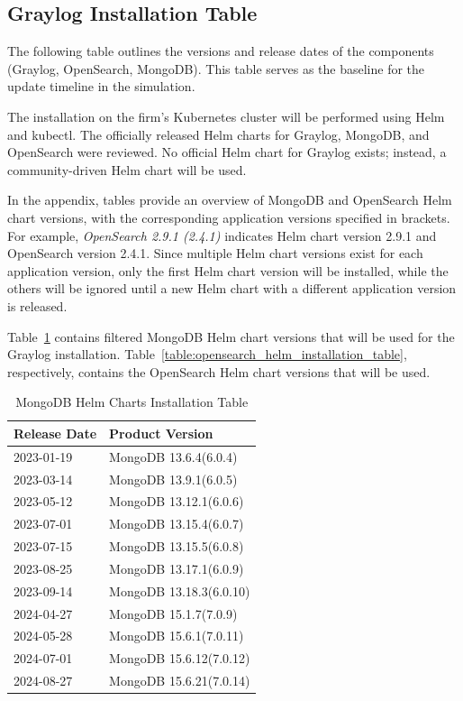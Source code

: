 \documentclass[../main.tex]{subfiles}
\begin{document}

\subsection{Graylog Installation Table}

The following table outlines the versions and release dates of the components (Graylog, OpenSearch, MongoDB). This table serves as the baseline for the update timeline in the simulation.

The installation on the firm's Kubernetes cluster will be performed using Helm and kubectl. The officially released Helm charts for Graylog, MongoDB, and OpenSearch were reviewed. No official Helm chart for Graylog exists; instead, a community-driven Helm chart will be used.  

In the appendix, tables provide an overview of MongoDB and OpenSearch Helm chart versions, with the corresponding application versions specified in brackets. For example, \textit{OpenSearch 2.9.1 (2.4.1)} indicates Helm chart version 2.9.1 and OpenSearch version 2.4.1. Since multiple Helm chart versions exist for each application version, only the first Helm chart version will be installed, while the others will be ignored until a new Helm chart with a different application version is released.

Table~\ref{table:mongodb_helm_installation_table} contains filtered MongoDB Helm chart versions that will be used for the Graylog installation. Table~\ref{table:opensearch_helm_installation_table}, respectively, contains the OpenSearch Helm chart versions that will be used.

\begin{table}[h]
\centering
\begin{tabular}{|l|l|}
\hline
\textbf{Release Date} & \textbf{Product Version} \\ \hline
2023-01-19 & MongoDB 13.6.4(6.0.4) \\ \hline
2023-03-14 & MongoDB 13.9.1(6.0.5) \\ \hline
2023-05-12 & MongoDB 13.12.1(6.0.6) \\ \hline
2023-07-01 & MongoDB 13.15.4(6.0.7) \\ \hline
2023-07-15 & MongoDB 13.15.5(6.0.8) \\ \hline
2023-08-25 & MongoDB 13.17.1(6.0.9) \\ \hline
2023-09-14 & MongoDB 13.18.3(6.0.10) \\ \hline
2024-04-27 & MongoDB 15.1.7(7.0.9) \\ \hline
2024-05-28 & MongoDB 15.6.1(7.0.11) \\ \hline
2024-07-01 & MongoDB 15.6.12(7.0.12) \\ \hline
2024-08-27 & MongoDB 15.6.21(7.0.14) \\ \hline
\end{tabular}
\caption{MongoDB Helm Charts Installation Table}
\label{table:mongodb_helm_installation_table}
\end{table}
\end{document}
